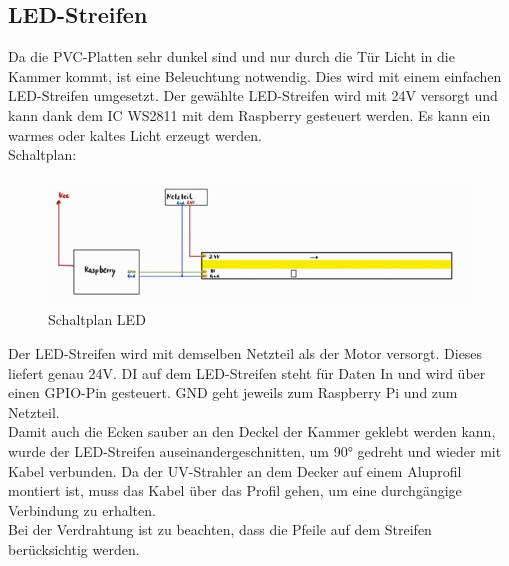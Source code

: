 \subsection{LED-Streifen}\label{sec:LED}
Da die PVC-Platten sehr dunkel sind und nur durch die Tür Licht in die Kammer kommt, ist eine Beleuchtung notwendig. Dies wird mit einem einfachen LED-Streifen umgesetzt. Der gewählte LED-Streifen wird mit 24V versorgt und kann dank dem IC WS2811 mit dem Raspberry gesteuert werden. Es kann ein warmes oder kaltes Licht erzeugt werden. \\
\vspace{3mm}
Schaltplan:\\
\vspace{2mm}
\begin{figure}[H]
    \centering
    \includegraphics[scale=1]{image/schaltplanled.jpg}
    \caption{Schaltplan LED}
    \label{fig:enter-label}
\end{figure}
\vspace{3mm}
Der LED-Streifen wird mit demselben Netzteil als der Motor versorgt. Dieses liefert genau 24V. DI auf dem LED-Streifen steht für Daten In und wird über einen GPIO-Pin gesteuert. GND geht jeweils zum Raspberry Pi und zum Netzteil. \\
\vspace{3mm}
Damit auch die Ecken sauber an den Deckel der Kammer geklebt werden kann, wurde der LED-Streifen auseinandergeschnitten, um 90° gedreht und wieder mit Kabel verbunden. Da der UV-Strahler an dem Decker auf einem Aluprofil montiert ist, muss das Kabel über das Profil gehen, um eine durchgängige Verbindung zu erhalten. \\
\vspace{3mm}
Bei der Verdrahtung ist zu beachten, dass die Pfeile auf dem Streifen berücksichtig werden. 
 